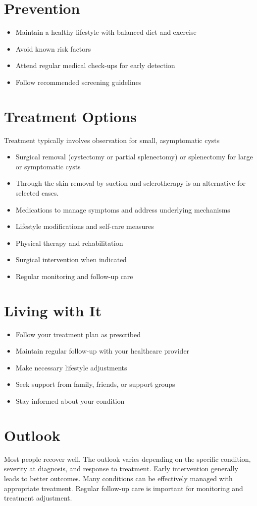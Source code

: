 \section{Prevention}
\begin{itemize}[noitemsep]
  \item Maintain a healthy lifestyle with balanced diet and exercise
  \item Avoid known risk factors
  \item Attend regular medical check-ups for early detection
  \item Follow recommended screening guidelines
\end{itemize}
\section{Treatment Options}
Treatment typically involves observation for small, asymptomatic cysts

\begin{itemize}[noitemsep]
  \item Surgical removal (cystectomy or partial splenectomy) or splenectomy for large or symptomatic cysts
  \item Through the skin removal by suction and sclerotherapy is an alternative for selected cases.
  \item Medications to manage symptoms and address underlying mechanisms
  \item Lifestyle modifications and self-care measures
  \item Physical therapy and rehabilitation
  \item Surgical intervention when indicated
  \item Regular monitoring and follow-up care
\end{itemize}
\section{Living with It}
\begin{itemize}[noitemsep]
  \item Follow your treatment plan as prescribed
  \item Maintain regular follow-up with your healthcare provider
  \item Make necessary lifestyle adjustments
  \item Seek support from family, friends, or support groups
  \item Stay informed about your condition
\end{itemize}
\section{Outlook}
Most people recover well. The outlook varies depending on the specific condition, severity at diagnosis, and response to treatment. Early intervention generally leads to better outcomes. Many conditions can be effectively managed with appropriate treatment. Regular follow-up care is important for monitoring and treatment adjustment.
